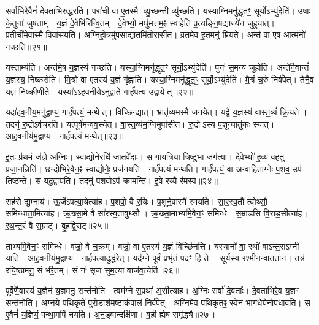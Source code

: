 सर्वा॑भिरे॒वैनं॑ दे॒वता॑भि॒रुद्ध॑रति।
परा॑ची॒ वा ए॒तस्मै व्यु॒च्छन्ती॒ व्यु॑च्छति।
यस्या॒ग्निमनु॑द्धृत॒ꣳ॒ सूर्यो॒\-ऽभ्यु॑देति॑।
उ॒षाः के॒तुना॑ जुषताम्।
य॒ज्ञं दे॒वेभि॑रिन्वि॒तम्।
दे॒वेभ्यो॒ मधु॑मत्तम॒ꣴ॒ स्वाहेति॑ प्र॒त्यङ्नि॒षद्याज्ये॑न जुहुयात्।
प्र॒तीची॑मे॒वास्मै॒ विवा॑सयति।
अ॒ग्नि॒हो॒त्रमु॑प॒साद्यातमि॑तोरासीत।
व्र॒तमे॒व ह॒तमनु॑ म्रियते।
अन्तं॒ वा ए॒ष आ॒त्मनो॑ गच्छति॥२१॥

यस्ताम्य॑ति।
अन्त॑मे॒ष य॒ज्ञस्य॑ गच्छति।
यस्या॒ग्निमनु॑द्धृत॒ꣳ॒ सूर्यो॒\-ऽभ्यु॑देति॑।
पुनः॑ स॒मन्य॑ जुहोति।
अन्ते॑नै॒वान्तं॑ य॒ज्ञस्य॒ निष्क॑रोति।
मि॒त्रो वा ए॒तस्य॑ य॒ज्ञं गृ॑ह्णाति।
यस्या॒ग्निमनु॑द्धृत॒ꣳ॒ सूर्यो॒\-ऽभ्यु॑देति॑।
मै॒त्रं च॒रुं निर्व॑पेत्।
तेनै॒व य॒ज्ञं निष्क्री॑णीते।
यस्या॑\-ऽऽहव॒नीये\-ऽनु॑द्वाते॒ गार्\mbox{}ह॑पत्य उ॒द्वायेत्॥२२॥

यदा॑हव॒नीय॒मनु॑द्वाप्य॒ गार्\mbox{}ह॑पत्यं॒ मन्थेत्।
विच्छि॑न्द्यात्।
भ्रातृ॑व्यमस्मै जनयेत्।
यद्वै य॒ज्ञस्य॑ वास्त॒व्यं॑ क्रि॒यते।
तदनु॑ रु॒द्रो\-ऽव॑चरति।
यत्पूर्व॑मन्वव॒स्येत्।
वा॒स्त॒व्य॑म॒ग्निमुपा॑सीत।
रु॒द्रोऽस्य प॒शून्घातु॑कः स्यात्।
आ॒ह॒व॒नीय॑मु॒द्वाप्य॑।
गार्\mbox{}ह॑पत्यं मन्थेत्॥२३॥

इ॒तः प्र॑थ॒मं ज॑ज्ञे अ॒ग्निः।
स्वाद्योने॒रधि॑ जा॒तवे॑दाः।
स गा॑यत्रि॒या त्रि॒ष्टुभा॒ जग॑त्या।
दे॒वेभ्यो॑ ह॒व्यं व॑हतु प्रजा॒नन्निति॑।
छन्दो॑भिरे॒वैन॒ꣴ॒ स्वाद्योनेः॒ प्रज॑नयति।
गार्\mbox{}ह॑पत्यं मन्थति।
गार्\mbox{}ह॑पत्यं॒ वा अन्वाहि॑ताग्नेः प॒शव॒ उप॑ तिष्ठन्ते।
स यदु॒द्वाय॑ति।
तदनु॑ प॒शवोऽप॑ क्रामन्ति।
इ॒षे र॒य्यै र॑मस्व॥२४॥

सह॑से द्यु॒म्नाय॑।
ऊ॒र्जे\-ऽपत्या॒येत्या॑ह।
प॒शवो॒ वै र॒यिः।
प॒शूने॒वास्मै॑ रमयति।
सा॒र॒स्व॒तौ त्वोथ्सौ॒ समि॑न्धाता॒मित्या॑ह।
ऋ॒ख्सा॒मे वै सा॑रस्व॒तावुथ्सौ।
ऋ॒ख्सा॒माभ्या॑मे॒वैन॒ꣳ॒ समि॑न्धे।
स॒म्राड॑सि वि॒राड॒सीत्या॑ह।
र॒थ॒न्त॒रं वै स॒म्राट्।
बृ॒हद्वि॒राट्॥२५॥

ताभ्या॑मे॒वैन॒ꣳ॒ समि॑न्धे।
वज्रो॒ वै च॒क्रम्।
वज्रो॒ वा ए॒तस्य॑ य॒ज्ञं विच्छि॑नत्ति।
यस्यानो॑ वा॒ रथो॑ वाऽन्त॒रा\-ऽग्नी याति॑।
आ॒ह॒व॒नीय॑मु॒द्वाप्य॑।
गार्\mbox{}ह॑पत्या॒दुद्ध॑रेत्।
यद॑ग्ने॒ पूर्वं॒ प्रभृ॑तं प॒दꣳ हि ते।
सूर्य॑स्य र॒श्मीनन्वा॑त॒तान॑।
तत्र॑ रयि॒ष्ठामनु॒ सं भ॑रै॒तम्।
सं नः॑ सृज सुम॒त्या वाज॑व॒त्येति॑॥२६॥

पूर्वे॑णै॒वास्य॑ य॒ज्ञेन॑ य॒ज्ञमनु॒ सन्त॑नोति।
त्वम॑ग्ने स॒प्रथा॑ अ॒सीत्या॑ह।
अ॒ग्निः सर्वा॑ दे॒वताः᳚।
दे॒वता॑भिरे॒व य॒ज्ञꣳ सन्त॑नोति।
अ॒ग्नये॑ पथि॒कृते॑ पुरो॒डाश॑म॒ष्टाक॑पालं॒ निर्व॑पेत्।
अ॒ग्निमे॒व प॑थि॒कृत॒ꣴ॒ स्वेन॑ भाग॒धेये॒नोप॑धावति।
स ए॒वैनं॑ य॒ज्ञियं॒ पन्था॒मपि॑ नयति।
अ॒न॒ड्वान्दक्षि॑णा।
व॒ही ह्ये॑ष समृ॑द्ध्यै॥२७॥

